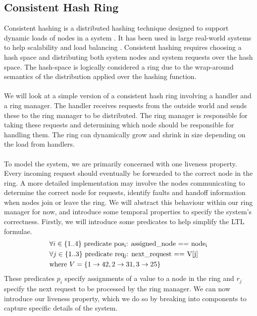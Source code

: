 \subsection{Consistent Hash Ring}
Consistent hashing is a distributed hashing technique designed to support dynamic loads of nodes in a system \cite{consistent_hash}. It has been used in large real-world systems to help scalability and load balancing \cite{dynamo}. Consistent hashing requires choosing a hash space and distributing both system nodes and system requests over the hash space. The hash-space is logically considered a ring due to the wrap-around semantics of the distribution applied over the hashing function.
\\ \\
We will look at a simple version of a consistent hash ring involving a handler and a ring manager. The handler receives requests from the outside world and sends these to the ring manager to be distributed. The ring manager is responsible for taking these requests and determining which node should be responsible for handling them. The ring can dynamically grow and shrink in size depending on the load from handlers.
\\ \\
To model the system, we are primarily concerned with one liveness property. Every incoming request should eventually be forwarded to the correct node in the ring. A more detailed implementation may involve the nodes communicating to determine the correct node for requests, identify faults and handoff information when nodes join or leave the ring. We will abstract this behaviour within our ring manager for now, and introduce some temporal properties to specify the system's correctness. Firstly, we will introduce some predicates to help simplify the LTL formulae.
\[
    \begin{aligned}
    & \forall i \in \{1..4\} \ \text{predicate pos\textsubscript{i}: assigned\_node == node\textsubscript{i}} \\
    & \forall j \in \{1..3\} \ \text{predicate req\textsubscript{j}: next\_request == V[j]} \\
    & \text{where } V = \{1 \rightarrow 42, 2 \rightarrow 31, 3 \rightarrow 25\}
    \end{aligned}
\]
These predicates $p_i$ specify assignments of a value to a node in the ring and $r_j$ specify the next request to be processed by the ring manager. We can now introduce our liveness property, which we do so by breaking into components to capture specific details of the system.

